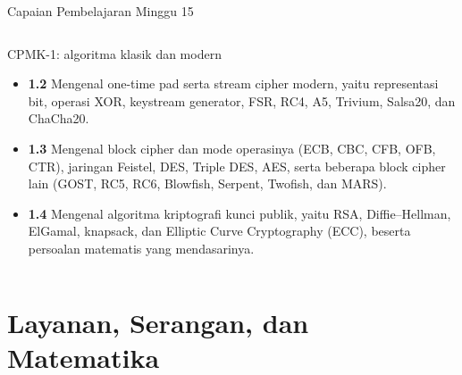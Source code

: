 \documentclass[aspectratio=169,11pt]{beamer}
\begin{document}
\begin{frame}{Capaian Pembelajaran Minggu 15}
\begin{columns}[T,onlytextwidth]
\begin{column}{0.49\textwidth}
\begin{block}{CPMK-1: algoritma klasik dan modern}
\begin{itemize}
                          (Caesar, monoalfabetik, Affine), transposisi
                          (Rail Fence), Vigen\`ere, Playfair, Hill, dan Enigma,
                          beserta gagasan kriptanalisisnya (analisis frekuensi
                          dan metode Kasiski).
                    \item \textbf{1.2} Mengenal one-time pad serta stream cipher
                          modern, yaitu representasi bit, operasi XOR,
                          keystream generator, FSR, RC4, A5, Trivium, Salsa20,
                          dan ChaCha20.
                    \item \textbf{1.3} Mengenal block cipher dan mode
                          operasinya (ECB, CBC, CFB, OFB, CTR), jaringan
                          Feistel, DES, Triple DES, AES, serta beberapa block
                          cipher lain (GOST, RC5, RC6, Blowfish, Serpent,
                          Twofish, dan MARS).
                    \item \textbf{1.4} Mengenal algoritma kriptografi kunci
                          publik, yaitu RSA, Diffie--Hellman, ElGamal,
                          knapsack, dan Elliptic Curve Cryptography (ECC),
                          beserta persoalan matematis yang mendasarinya.
                \end{itemize}
            \end{block}
        \end{column}
    \end{columns}
\end{frame}

\section{Layanan, Serangan, dan Matematika}
\end{document}

